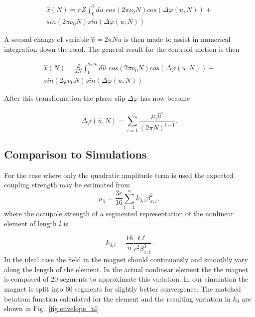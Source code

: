\documentclass[aps,prstab,twocolumn, groupedaddress]{revtex4-1}
\begin{document}
\begin{multline}
\hat{x}(N) = \pi Z \int_{0}^{1} du \,\, cos(2 \pi \nu_0 N)cos(\Delta \varphi(u, N)) +\\  sin(2 
\pi 
\nu_0 N) sin(\Delta \varphi(u, N))
\end{multline}

A second change of variable $\hat{u} = 2 \pi N u$ is then made to assist in numerical 
integration down the road. The general result for the centroid motion is then

\begin{multline} \label{eq:general_centroid}
\hat{x}(N) = \frac{Z}{2 N} \int_{0}^{2\pi N} d\hat{u} \,\, cos(2 \pi \nu_0 N)cos(\Delta 
\varphi(u, 
N)) - \\
sin(2 \varphi 
\nu_0 N) sin(\Delta \varphi(u, N))
\end{multline}

After this transformation the phase slip $\Delta \varphi$ has now become

\begin{equation} \label{eq:phase_slip_2} 
\Delta \varphi(\hat{u}, N) = \sum_{i=1} \frac{\mu_i \hat{u}^{i}}{(2 \pi N)^{i - 1}}.
\end{equation}

\subsection{Comparison to Simulations}
For the case where only the quadratic amplitude term is used the expected coupling 
strength may be estimated from \cite{talman:86}
\begin{equation} \label{eq:octupole_coeff}
\mu_1 = \frac{3 \varepsilon}{16} \sum_{i=1}^n k_{3, i}\beta_{x, i}^2,
\end{equation}
where the octupole strength of a segmented representation of the nonlinear element of 
length $l$ is

\begin{equation}
k_{3,i} = \frac{16}{n} \frac{t \ell}{c^2\beta^3_{x,i} }.
\end{equation}
In the ideal case the field in the magnet should continuously and smoothly vary along the 
length of the element. In the actual nonlinear element the the magnet is composed of 20 
segments to approximate this variation. In our simulation the magnet is split into 60 
segments for slightly better convergence. The  matched betatron function calculated for 
the element and the resulting variation in $k_3$ are shown in Fig.~\ref{fig:envelope_nl}.
\end{document}
